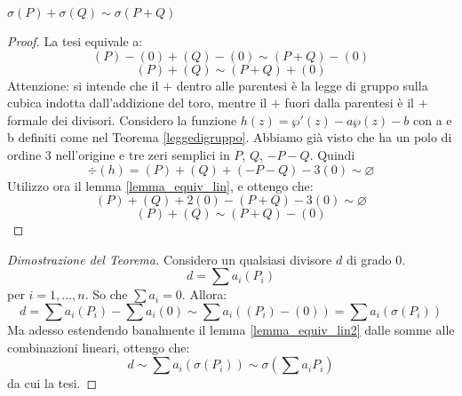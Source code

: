 \begin{lemma}
  \label{lemma_equiv_lin2}
$\sigma(P)+\sigma(Q) \sim \sigma (P+Q)$
\end{lemma}
\begin{proof}
La tesi equivale a:
$$(P)-(0)+(Q)-(0) \sim (P+Q)-(0)$$
$$(P)+(Q)\sim (P+Q)+(0)$$
Attenzione: si intende che il $+$ dentro alle parentesi è la legge di gruppo sulla cubica indotta dall'addizione del toro, mentre il $+$ fuori dalla parentesi è il $+$ formale dei divisori.
Considero la funzione $h(z) = \wp'(z) - a \wp(z) - b$ con a e b definiti come nel Teorema \ref{leggedigruppo}. Abbiamo già visto che ha un polo di ordine $3$ nell'origine e tre zeri semplici in $P$, $Q$, $-P-Q$. Quindi $$\div(h)=(P)+(Q)+(-P-Q)-3(0) \sim \varnothing$$
Utilizzo ora il lemma \ref{lemma_equiv_lin}, e ottengo che:
$$(P)+(Q)+2(0)-(P+Q)-3(0) \sim \varnothing$$
$$(P)+(Q) \sim (P+Q)-(0)$$
\end{proof}

\begin{proof}[Dimostrazione del Teorema]
Considero un qualsiasi divisore $d$ di grado $0$.
$$d=\sum a_i (P_i)$$
per $i=1,...,n$. So che $\sum a_i=0$. Allora:
$$d = \sum a_i (P_i)-\sum a_i (0) \sim \sum a_i ((P_i)-(0))=\sum a_i (\sigma(P_i))$$
Ma adesso estendendo banalmente il lemma \ref{lemma_equiv_lin2} dalle somme alle combinazioni lineari, ottengo che:
$$d \sim \sum a_i (\sigma(P_i)) \sim \sigma(\sum a_i P_i)$$
da cui la tesi.
\end{proof}

